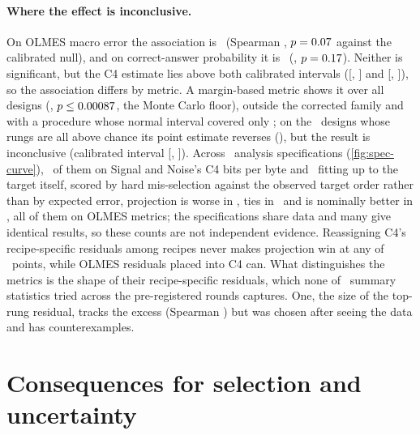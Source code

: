 \documentclass{article}
\begin{document}
\paragraph{Where the effect is inconclusive.} On OLMES macro error the
association is \lamOlmesVerdict\ (Spearman \lamOlmesRho, $p=0.07$ against
the calibrated null), and on correct-answer probability it is
\lamCpVerdict\ (\lamCpRho, $p=0.17$). Neither is significant, but the C4
estimate lies above both calibrated intervals ([\lamOlmesLow, \lamOlmesHigh] and
[\lamCpLow, \lamCpHigh]), so the association differs by metric. A margin-based
metric shows it over all designs (\lamMarginRho, $p\le0.00087$, the Monte
Carlo floor), outside the corrected family and with a procedure whose normal
interval covered only \lamMarginAllCov; on the \lamMarginSubN\ designs whose
rungs are all above chance its point estimate reverses (\lamMarginSubRho), but
the result is inconclusive (calibrated interval
[\lamMarginSubLow, \lamMarginSubHigh]). Across \specN\ analysis specifications
(\cref{fig:spec-curve}), \specSN\ of them on Signal and Noise's C4 bits per
byte \citep{heineman2025signal} and \specZeroLever\ fitting up to the target
itself, scored by hard mis-selection against the observed
target order rather than by expected error, projection is worse in \specPositive,
ties in \specTies\ and is nominally better in \specBelow, all of them on OLMES
metrics; the specifications share data and many give identical results, so these
counts are not independent evidence. Reassigning
C4's recipe-specific residuals among recipes never makes projection win at any
of \mechSweepPoints\ points, while OLMES residuals placed into C4 can. What
distinguishes the metrics is the shape of their recipe-specific residuals,
which none of \statsTriedAll\ summary statistics tried across the pre-registered
rounds captures. One, the size of the top-rung residual, tracks the excess (Spearman
\statsNearMissRho) but was chosen after seeing the data and has
counterexamples.

\section{Consequences for selection and uncertainty}
\label{sec:consequences}
\end{document}
